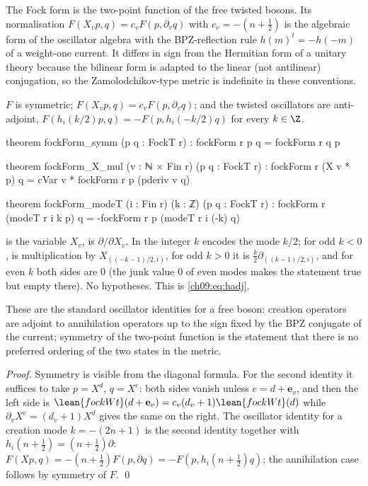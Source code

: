 \begin{physics}
The Fock form is the two-point function of the free twisted bosons. Its normalisation $F(X_vp,q)=c_vF(p,\partial_vq)$ with $c_v=-(n+\frac12)$ is the algebraic form of the oscillator algebra with the BPZ-reflection rule $h(m)^t=-h(-m)$ of a weight-one current. It differs in sign from the Hermitian form of a unitary theory because the bilinear form is adapted to the linear (not antilinear) conjugation, so the Zamolodchikov-type metric is indefinite in these conventions.
\end{physics}

\begin{theorem}\label{ch09:thm:fockbasic}
$F$ is symmetric; $F(X_vp,q)=c_vF(p,\partial_vq)$; and the twisted oscillators are anti-adjoint,
$F(h_i(k/2)p,q)=-F(p,h_i(-k/2)q)$ for every $k\in\Z$.
\end{theorem}
\begin{leancode}
theorem fockForm_symm (p q : FockT r) : fockForm r p q = fockForm r q p

theorem fockForm_X_mul (v : ℕ × Fin r) (p q : FockT r) :
    fockForm r (X v * p) q = cVar v * fockForm r p (pderiv v q)

theorem fockForm_modeT (i : Fin r) (k : ℤ) (p q : FockT r) :
    fockForm r (modeT r i k p) q = -fockForm r p (modeT r i (-k) q)
\end{leancode}
\begin{dictionary}
 is the variable $X_v$,  is $\partial/\partial X_v$. In
 the integer $k$ encodes the mode $k/2$; for odd $k<0$, 
is multiplication by $X_{((-k-1)/2,i)}$, for odd $k>0$ it is $\tfrac k2\partial_{((k-1)/2,i)}$,
and for even $k$ both sides are $0$ (the junk value $0$ of even modes makes the statement true but
empty there). No hypotheses. This is \eqref{ch09:eq:hadj}.
\end{dictionary}
\begin{physics}
These are the standard oscillator identities for a free boson: creation operators are adjoint to annihilation operators up to the sign fixed by the BPZ conjugate of the current; symmetry of the two-point function is the statement that there is no preferred ordering of the two states in the metric.
\end{physics}

\noindent\emph{Proof.} Symmetry is visible from the diagonal formula. For the second identity it
suffices to take $p=X^d$, $q=X^e$: both sides vanish unless $e=d+\mathbf e_v$, and then the left
side is $\lean{fockWt}(d+\mathbf e_v)=c_v(d_v+1)\lean{fockWt}(d)$ while $\partial_vX^e=(d_v+1)X^d$
gives the same on the right. The oscillator identity for a creation mode $k=-(2n+1)$ is the second
identity together with $h_i(n+\tfrac12)=(n+\tfrac12)\partial$: $F(Xp,q)=-(n+\tfrac12)F(p,\partial q)=-F(p,h_i(n+\tfrac12)q)$;
the annihilation case follows by symmetry of $F$. \qed

